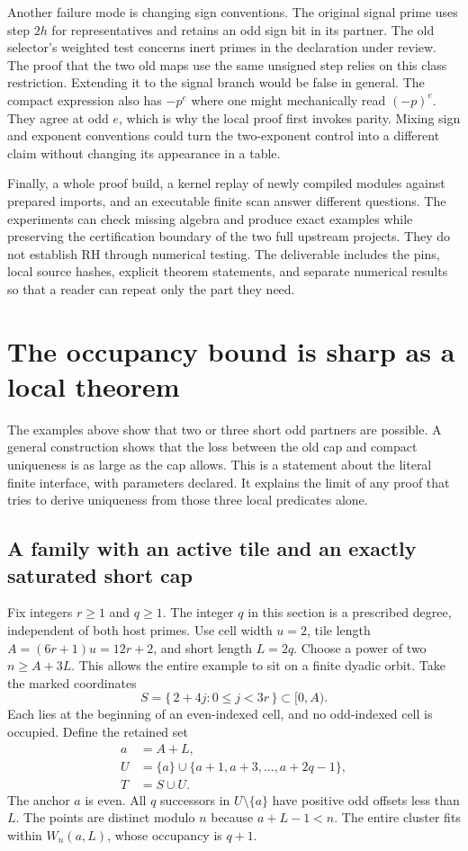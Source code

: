 \documentclass[12pt,letterpaper]{article}
\begin{document}
Another failure mode is changing sign conventions. The original signal prime uses step $2h$ for representatives and retains an odd sign bit in its partner. The old selector's weighted test concerns inert primes in the declaration under review. The proof that the two old maps use the same unsigned step relies on this class restriction. Extending it to the signal branch would be false in general. The compact expression also has \(-p^e\) where one might mechanically read \((-p)^e\). They agree at odd $e$, which is why the local proof first invokes parity. Mixing sign and exponent conventions could turn the two-exponent control into a different claim without changing its appearance in a table.

Finally, a whole proof build, a kernel replay of newly compiled modules against prepared imports, and an executable finite scan answer different questions. The experiments can check missing algebra and produce exact examples while preserving the certification boundary of the two full upstream projects. They do not establish RH through numerical testing. The deliverable includes the pins, local source hashes, explicit theorem statements, and separate numerical results so that a reader can repeat only the part they need.

\section{The occupancy bound is sharp as a local theorem}
\label{sec:sharp}

The examples above show that two or three short odd partners are possible. A general construction shows that the loss between the old cap and compact uniqueness is as large as the cap allows. This is a statement about the literal finite interface, with parameters declared. It explains the limit of any proof that tries to derive uniqueness from those three local predicates alone.

\subsection{A family with an active tile and an exactly saturated short cap}

Fix integers \(r\ge1\) and \(q\ge1\). The integer \(q\) in this section is a prescribed degree, independent of both host primes. Use cell width \(u=2\), tile length \(A=(6r+1)u=12r+2\), and short length \(L=2q\). Choose a power of two \(n\ge A+3L\). This allows the entire example to sit on a finite dyadic orbit. Take the marked coordinates
\[
                S=\{\,2+4j:0\le j<3r\,\}\subset[0,A).
\]
Each lies at the beginning of an even-indexed cell, and no odd-indexed cell is occupied. Define the retained set
\begin{align*}
 a&=A+L,\\
 U&=\{a\}\cup\{a+1,a+3,\ldots,a+2q-1\},\\
 T&=S\cup U.
\end{align*}
The anchor \(a\) is even. All \(q\) successors in \(U\setminus\{a\}\) have positive odd offsets less than \(L\). The points are distinct modulo \(n\) because \(a+L-1<n\). The entire cluster fits within \(W_n(a,L)\), whose occupancy is \(q+1\).
\end{document}
